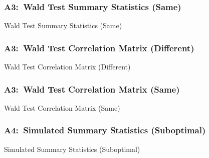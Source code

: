 \documentclass[12pt, aspectratio=169]{beamer}
\begin{document}
\begin{frame}[label=wtsss]
\frametitle{A3:\ Wald Test Summary Statistics (Same)}
\addtocounter{framenumber}{-1}
\begin{table}[htbp]
  \centering
  \addtocounter{table}{-1}
  \renewcommand{\thetable}{\arabic{table}b}
  \caption{Wald Test Summary Statistics (Same)}
  \vspace{5pt}
  \begin{adjustbox}{totalheight=.7\textheight}

  \end{adjustbox}
\end{table}%
\hyperlink{avsa}{}
\end{frame}

\begin{frame}[label=wtcmd]
\frametitle{A3:\ Wald Test Correlation Matrix (Different)}
\begin{table}[htbp]
  \renewcommand{\thetable}{\arabic{table}a}
  \caption{Wald Test Correlation Matrix (Different)}
  \vspace{-5pt}
  \begin{adjustbox}{width=1\textwidth}

  \end{adjustbox}
\end{table}%
\hyperlink{avsa}{}
\end{frame}

\begin{frame}[label=wtcms]
\frametitle{A3:\ Wald Test Correlation Matrix (Same)}
\addtocounter{framenumber}{-1}
\begin{table}[htbp]
  \centering
  \addtocounter{table}{-1}
  \renewcommand{\thetable}{\arabic{table}b}
  \caption{Wald Test Correlation Matrix (Same)}
  \vspace{-5pt}
  \begin{adjustbox}{width=1\textwidth}

  \end{adjustbox}
\end{table}%
\hyperlink{avsa}{}
\end{frame}

\begin{frame}[label=ssss]
\frametitle{A4:\ Simulated Summary Statistics (Suboptimal)}
\begin{table}[htbp]
  \centering
  \renewcommand{\thetable}{\arabic{table}a}
  \caption{Simulated Summary Statistics (Suboptimal)}
  \vspace{5pt}
  \begin{adjustbox}{totalheight=.7\textheight}

  \end{adjustbox}
\end{table}%
\hyperlink{ydues}{}
\end{frame}
\end{document}
